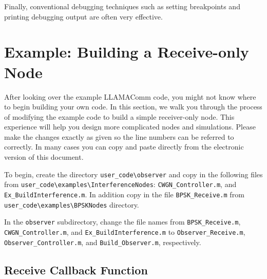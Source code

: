 Finally, conventional debugging techniques such as setting breakpoints and
printing debugging output are often very effective.

\section{Example: Building a Receive-only Node}
\label{sec:adding_observer}
After looking over the example LLAMAComm code, you might not know where to begin building your own code.  In this section, we walk you through the process of modifying the example code to build a simple receiver-only node.  This experience will help you design more complicated nodes and simulations.  Please make the changes exactly as given so the line numbers can be referred to correctly.  In many cases you can copy and paste directly from the electronic version of this document.

To begin, create the directory \verb+user_code\observer+ and copy in the following files from 
\verb+user_code\examples\InterferenceNodes+: \verb+CWGN_Controller.m+, and \verb+Ex_BuildInterference.m+.  
In addition copy in the file \verb+BPSK_Receive.m+ from \verb+user_code\examples\BPSKNodes+ directory.

In the \verb+observer+ subdirectory, 
change the file names from \verb+BPSK_Receive.m+, \verb+CWGN_Controller.m+, and \verb+Ex_BuildInterference.m+ to \verb+Observer_Receive.m+, \verb+Observer_Controller.m+, and \verb+Build_Observer.m+, respectively.

\subsection{Receive Callback Function}
\label{sec:observer_rec}


